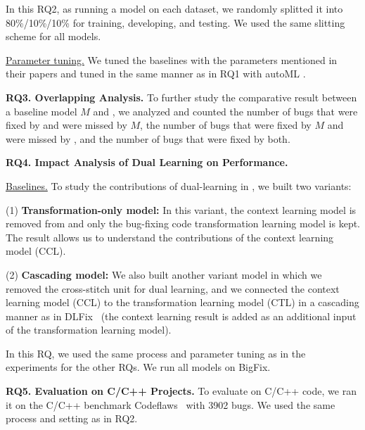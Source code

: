 

In this RQ2, as running a model on each dataset, we randomly splitted
it into 80\%/10\%/10\% for training, developing, and testing. We used
the same slitting scheme for all models.


\underline{Parameter tuning.} We tuned the baselines with the
parameters mentioned in their papers and tuned {\tool} in the same
manner as in RQ1 with autoML \cite{NNI}.

{\bf RQ3. Overlapping Analysis.} To further study the comparative
result between a baseline model $M$ and {\tool}, we analyzed and
counted the number of bugs that were fixed by {\tool} and were missed
by $M$, the number of bugs that were fixed by $M$ and were missed
by {\tool}, and the number of bugs that were fixed by both.


{\bf RQ4. Impact Analysis of Dual Learning on Performance.}

\underline{Baselines.} To study the contributions of dual-learning in
{\tool}, we built two variants:

(1) \textbf{Transformation-only model:} In this variant, the
context learning model is removed from {\tool} and only the bug-fixing
code transformation learning model is kept. The result allows us to
understand the contributions of the context learning model (CCL).


(2) \textbf{Cascading model:} We also built another variant model in
which we removed the cross-stitch unit for dual learning, and we
connected the context learning model (CCL) to the transformation
learning model (CTL) in a cascading manner as in DLFix~\cite{icse20}
(the context learning result is added as an additional input of the
transformation learning model).


In this RQ, we used the same process and parameter tuning as in the
experiments for the other RQs. We run all models on BigFix.


{\bf RQ5. Evaluation on C/C++ Projects.}  To evaluate {\tool} on C/C++
code, we ran it on the C/C++ benchmark
Codeflaws~\cite{tan2017codeflaws} with 3902 bugs. 
We used the same process and setting as in RQ2.
